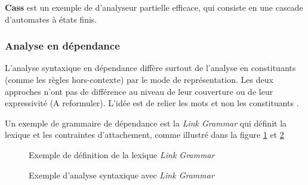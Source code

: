 \textbf{Cass} est un exemple de d'analyseur partielle efficace, qui consiste en une cascade d'automates à états finis.

\subsubsection{Analyse en dépendance}
L’analyse syntaxique en dépendance diffère surtout de l’analyse en constituants (comme les règles hors-contexte) par le mode de représentation. Les deux approches n’ont pas de différence au niveau de leur couverture ou de leur expressivité (A reformuler). L'idée est de relier les mots et non les constituants \citep{automatic-nlp}.

Un exemple de grammaire de dépendance est la \emph{Link Grammar} qui définit la lexique et les contraintes d'attachement, comme illustré dans la figure \ref{link-grammar} et \ref{link-grammar-syntax}

\begin{figure}[htbp]
    \begin{center}
        \caption{Exemple de définition de la lexique \emph{Link Grammar} \citep{automatic-nlp}}
    \end{center}
    \label{link-grammar}
\end{figure}

\begin{figure}[htbp]
    \begin{center}
        \caption{Exemple d'analyse syntaxique avec \emph{Link Grammar} \citep{automatic-nlp}}
    \end{center}
    \label{link-grammar-syntax}
\end{figure}

